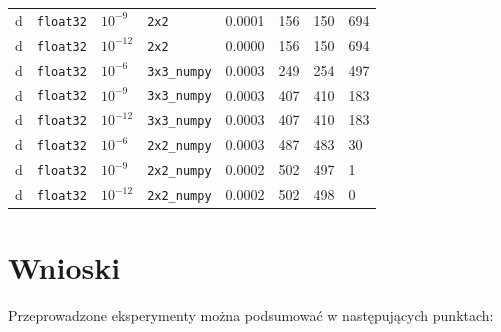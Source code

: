 \documentclass[11pt,a4paper]{article}
\begin{document}
\begin{table}[htbp]
\begin{tabular}{llllllll}
        d & \texttt{float32} & $10^{-9}$  & \texttt{2x2}        & 0.0001 & 156 & 150 & 694  \\
        d & \texttt{float32} & $10^{-12}$ & \texttt{2x2}        & 0.0000 & 156 & 150 & 694  \\
        \midrule
        d & \texttt{float32} & $10^{-6}$  & \texttt{3x3\_numpy} & 0.0003 & 249 & 254 & 497  \\
        d & \texttt{float32} & $10^{-9}$  & \texttt{3x3\_numpy} & 0.0003 & 407 & 410 & 183  \\
        d & \texttt{float32} & $10^{-12}$ & \texttt{3x3\_numpy} & 0.0003 & 407 & 410 & 183  \\
        \midrule
        d & \texttt{float32} & $10^{-6}$  & \texttt{2x2\_numpy} & 0.0003 & 487 & 483 & 30   \\
        d & \texttt{float32} & $10^{-9}$  & \texttt{2x2\_numpy} & 0.0002 & 502 & 497 & 1    \\
        d & \texttt{float32} & $10^{-12}$ & \texttt{2x2\_numpy} & 0.0002 & 502 & 498 & 0    \\
        \bottomrule
    \end{tabular}
\end{table}

\section{Wnioski}

Przeprowadzone eksperymenty można podsumować w następujących punktach:
\end{document}
